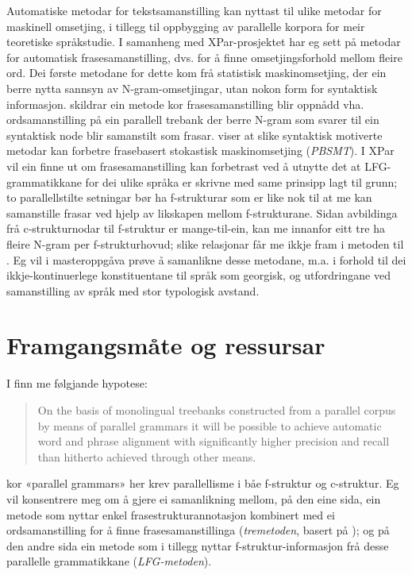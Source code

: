 \documentclass[11pt,a4paper,oneside,draft]{book}
\begin{document}
Automatiske metodar for tekstsamanstilling kan nyttast til ulike
metodar for maskinell omsetjing, i tillegg til oppbygging av
parallelle korpora for meir teoretiske språkstudie. I samanheng med
XPar-prosjektet \citep{xpar2008rcn} har eg sett på metodar for
automatisk frasesamanstilling, dvs. for å finne omsetjingsforhold
mellom fleire ord. Dei første metodane for dette kom frå statistisk
maskinomsetjing, der ein berre nytta sannsyn av N-gram-omsetjingar,
utan nokon form for syntaktisk informasjon.  \citet{samuelsson2007apa}
skildrar ein metode kor frasesamanstilling blir oppnådd
vha. ordsamanstilling på ein parallell trebank der berre N-gram som
svarer til ein syntaktisk node blir samanstilt som
frasar. \citet{tinsley2007ept, hearne2008ccd} viser at slike
syntaktisk motiverte metodar kan forbetre frasebasert stokastisk
maskinomsetjing (\emph{PBSMT}). I XPar vil ein finne ut om
frasesamanstilling kan forbetrast ved å utnytte det at
LFG-grammatikkane for dei ulike språka er skrivne med same prinsipp
lagt til grunn; to parallellstilte setningar bør ha f-strukturar som
er like nok til at me kan samanstille frasar ved hjelp av likskapen
mellom f-strukturane. Sidan avbildinga frå c-strukturnodar til
f-struktur er mange-til-ein, kan me innanfor eitt tre ha fleire N-gram
per f-strukturhovud; slike relasjonar får me ikkje fram i metoden til
\citet{samuelsson2007apa}. Eg vil i masteroppgåva prøve å samanlikne
desse metodane, m.a. i forhold til dei ikkje-kontinuerlege
konstituentane til språk som georgisk, og utfordringane ved
samanstilling av språk med stor typologisk avstand.

\section{Framgangsmåte og ressursar}
\label{sec-1.1}

I \citet[s.~5--6]{xpar2008rcn} finn me følgjande hypotese:

\begin{quote}
On the basis of monolingual treebanks constructed from a parallel
corpus by means of parallel grammars it will be possible to achieve
automatic word and phrase alignment with significantly higher
precision and recall than hitherto achieved through other means.
\end{quote}

kor «parallel grammars» her krev parallellisme i båe f-struktur og
c-struktur. Eg vil konsentrere meg om å gjere ei samanlikning mellom,
på den eine sida, ein metode som nyttar enkel frasestrukturannotasjon
kombinert med ei ordsamanstilling for å finne frasesamanstillinga
(\emph{tremetoden}, basert på \citet{samuelsson2007apa}); og på den andre
sida ein metode som i tillegg nyttar f-struktur-informasjon frå desse
parallelle grammatikkane (\emph{LFG-metoden}).
\end{document}

